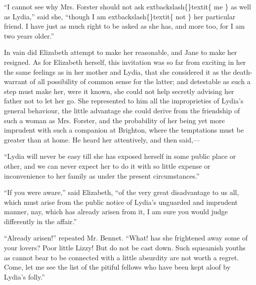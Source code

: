 \documentclass[10pt]{book}
\begin{document}
   “I cannot see why Mrs. Forster should not ask
   	extbackslash\{\}textit\{
    me
   \}
   as well as Lydia,”
said she, “though I am
   	extbackslash\{\}textit\{
    not
   \}
   her particular friend. I have just as much
right to be asked as she has, and more too, for I am two years older.”
  

   In vain did Elizabeth attempt to make her reasonable, and Jane to make
her resigned. As for Elizabeth herself, this invitation was so far from
exciting in her the same feelings as in her mother and Lydia, that she
considered it as the death-warrant of all possibility of common sense
for the latter; and detestable as such a step must make her, were it
known, she could not help secretly advising her father not to let her
go. She represented to him all the improprieties of Lydia’s general
behaviour, the little advantage she could derive from the friendship of
such a woman as Mrs. Forster, and the probability of her being yet more
imprudent with such a companion at Brighton, where the temptations must
be greater than at home. He heard her attentively, and then said,—
  

   “Lydia will never be easy till she has exposed herself in some public
place or other, and we can never expect her to do it with so little
expense or inconvenience to her family as under the present
circumstances.”
  

   “If you were aware,” said Elizabeth, “of the very great
   disadvantage to
us all, which must arise from the public notice of Lydia’s unguarded and
imprudent manner, nay, which has already arisen from it, I am sure you
would judge differently in the affair.”
  

   “Already arisen!” repeated Mr. Bennet. “What! has she frightened away
some of your lovers? Poor little Lizzy! But do not be cast down. Such
squeamish youths as cannot bear to be connected with a little absurdity
are not worth a regret. Come, let me see the list of the pitiful fellows
who have been kept aloof by Lydia’s folly.”
  
\end{document}
